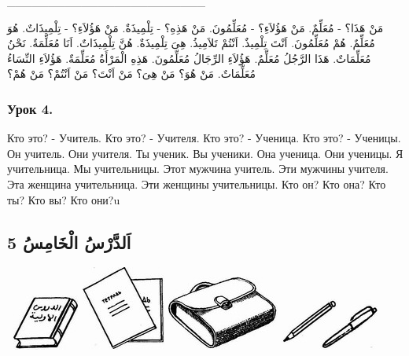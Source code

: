\documentclass[a5paper]{article}
\begin{document}
\_\_\_\_\_\_\_\_\_\_\_\_\_\_\_\_\_\_\_\_\_\_\_\_

مَنْ هَذَا؟ - مُعَلِّمٌ. مَنْ هَؤُلاَءِ؟ - مُعَلِّمُونَ. مَنْ هَذِهِ؟ - تِلْمِيذَةٌ. مَنْ هَؤُلاَءِ؟ - تِلْمِيذَاتٌ. هُوَ مُعَلِّمٌ. هُمْ مُعَلِّمُونَ. اَنْتَ تِلْمِيذٌ. اَنْتُمْ تَلاَمِيذُ. هِىَ تِلْمِيذَةٌ. هُنَّ تِلْمِيذَاتٌ. اَنَا مُعَلِّمَةٌ. نَحْنُ مُعَلِّمَاتٌ. هَذَا الرَّجُلُ مُعَلِّمٌ. هَؤُلاَءِ الرِّجَالُ مُعَلِّمُونَ. هَذِهِ الْمَرْأَةُ مُعَلِّمَةٌ. هَؤُلاَءِ النِّسَاءُ مُعَلِّمَاتٌ. مَنْ هُوَ؟ مَنْ هِىَ؟ مَنْ اَنْتَ؟ مَنْ اَنْتُمْ؟ مَنْ هُمْ؟

\subsubsection{Урок 4. }
Кто это? - Учитель. Кто это? - Учителя. Кто это? - Ученица. Кто это? - Ученицы. Он учитель. Они учителя. Ты ученик. Вы ученики. Она ученица. Они ученицы. Я учительница. Мы учительницы. Этот мужчина учитель. Эти мужчины учителя. Эта женщина учительница. Эти женщины учительницы. Кто он? Кто она? Кто ты? Кто вы? Кто они?u

\subsection{اَلدَّرْسُ الْخَامِسُ 5}
\  \includegraphics[width=0.8752in,height=0.7189in]{images/MuhammadBagauddinprettified-img002.jpg}   \includegraphics[width=1.0937in,height=1.0937in]{images/MuhammadBagauddinprettified-img003.jpg}   \includegraphics[width=1.448in,height=0.9689in]{images/MuhammadBagauddinprettified-img004.jpg}   \includegraphics[width=1.2709in,height=0.6772in]{images/MuhammadBagauddinprettified-img005.jpg} 
\end{document}

